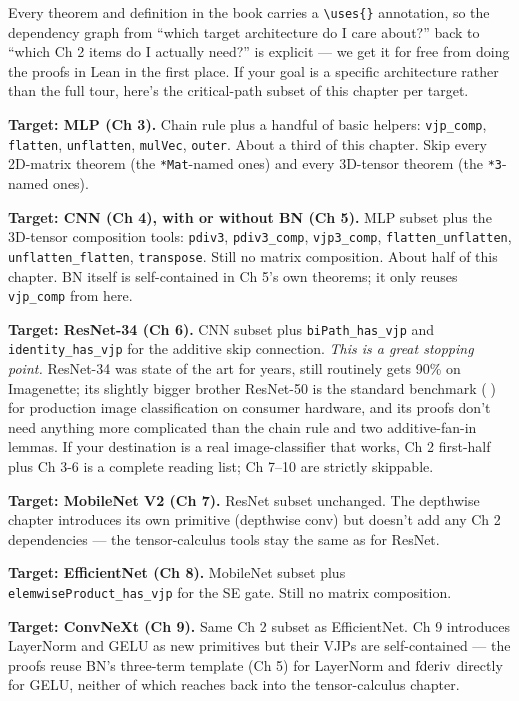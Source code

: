 Every theorem and definition in the book carries a
\texttt{\textbackslash uses\{\}} annotation, so the dependency graph
from ``which target architecture do I care about?'' back to ``which
Ch 2 items do I actually need?'' is explicit --- we get it for free
from doing the proofs in Lean in the first place. If your goal is a
specific architecture rather than the full tour, here's the
critical-path subset of this chapter per target.

\textbf{Target: MLP (Ch 3).} Chain rule plus a handful of basic
helpers: \texttt{vjp\_comp}, \texttt{flatten}, \texttt{unflatten},
\texttt{mulVec}, \texttt{outer}. About a third of this chapter. Skip
every 2D-matrix theorem (the \texttt{*Mat}-named ones) and every
3D-tensor theorem (the \texttt{*3}-named ones).

\textbf{Target: CNN (Ch 4), with or without BN (Ch 5).} MLP subset
plus the 3D-tensor composition tools: \texttt{pdiv3}, \texttt{pdiv3\_comp},
\texttt{vjp3\_comp}, \texttt{flatten\_unflatten}, \texttt{unflatten\_flatten},
\texttt{transpose}. Still no matrix composition. About half of this
chapter. BN itself is self-contained in Ch 5's own theorems; it only
reuses \texttt{vjp\_comp} from here.

\textbf{Target: ResNet-34 (Ch 6).} CNN subset plus
\texttt{biPath\_has\_vjp} and \texttt{identity\_has\_vjp} for the
additive skip connection. \emph{This is a great stopping point.}
ResNet-34 was state of the art for years, still routinely gets 90\%
on Imagenette; its slightly bigger brother ResNet-50 is the standard
benchmark (🐐) for production image classification on consumer
hardware, and its proofs don't need
anything more
complicated than the chain rule and two additive-fan-in lemmas. If
your destination is a real image-classifier that works, Ch 2
first-half plus Ch 3-6 is a complete reading list; Ch 7--10 are
strictly skippable.

\textbf{Target: MobileNet V2 (Ch 7).} ResNet subset unchanged. The
depthwise chapter introduces its own primitive (depthwise conv) but
doesn't add any Ch 2 dependencies --- the tensor-calculus tools
stay the same as for ResNet.

\textbf{Target: EfficientNet (Ch 8).} MobileNet subset plus
\texttt{elemwiseProduct\_has\_vjp} for the SE gate. Still no matrix
composition.

\textbf{Target: ConvNeXt (Ch 9).} Same Ch 2 subset as
EfficientNet. Ch 9 introduces LayerNorm and GELU as new primitives
but their VJPs are self-contained --- the proofs reuse BN's three-term
template (Ch 5) for LayerNorm and \(\operatorname{fderiv}\) directly for GELU,
neither of which reaches back into the tensor-calculus chapter.

